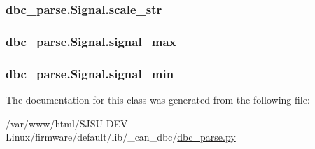 \subsubsection[{\texorpdfstring{scale\+\_\+str}{scale_str}}]{\setlength{\rightskip}{0pt plus 5cm}dbc\+\_\+parse.\+Signal.\+scale\+\_\+str}\hypertarget{classdbc__parse_1_1Signal_a39ba9bac6b2f60376c169b299e20b017}{}\label{classdbc__parse_1_1Signal_a39ba9bac6b2f60376c169b299e20b017}
\subsubsection[{\texorpdfstring{signal\+\_\+max}{signal_max}}]{\setlength{\rightskip}{0pt plus 5cm}dbc\+\_\+parse.\+Signal.\+signal\+\_\+max}\hypertarget{classdbc__parse_1_1Signal_a82b53a33dbba539f6ad99e9f17c8f87b}{}\label{classdbc__parse_1_1Signal_a82b53a33dbba539f6ad99e9f17c8f87b}
\subsubsection[{\texorpdfstring{signal\+\_\+min}{signal_min}}]{\setlength{\rightskip}{0pt plus 5cm}dbc\+\_\+parse.\+Signal.\+signal\+\_\+min}\hypertarget{classdbc__parse_1_1Signal_a87563549f85b5c452c52c18d2475dc0f}{}\label{classdbc__parse_1_1Signal_a87563549f85b5c452c52c18d2475dc0f}


The documentation for this class was generated from the following file\+:\begin{DoxyCompactItemize}
\item 
/var/www/html/\+S\+J\+S\+U-\/\+D\+E\+V-\/\+Linux/firmware/default/lib/\+\_\+can\+\_\+dbc/\hyperlink{dbc__parse_8py}{dbc\+\_\+parse.\+py}\end{DoxyCompactItemize}
